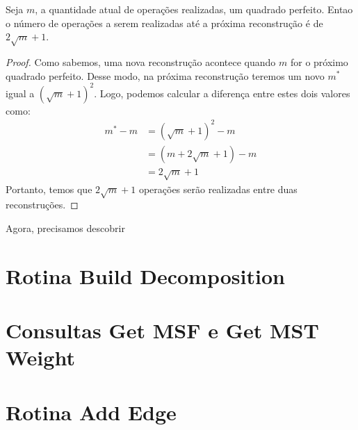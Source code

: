 \begin{corollary}
    \label{coro:amt-op}
    Seja $m$, a quantidade atual de operações realizadas, um quadrado perfeito. Entao o número de operações a serem realizadas até a próxima reconstrução é de $2 \sqrt{m} + 1$.
\end{corollary}
\begin{proof}
    Como sabemos, uma nova reconstrução acontece quando $m$ for o próximo quadrado perfeito. Desse modo, na próxima reconstrução teremos um novo $m^*$ igual a $(\sqrt m + 1)^2$. Logo, podemos calcular a diferença entre estes dois valores como:
    \begin{align*}
        m^* - m & = (\sqrt m + 1)^2 - m    \\
                & = (m + 2\sqrt m + 1) - m \\
                & = 2\sqrt m + 1
    \end{align*}
    Portanto, temos que $2\sqrt m + 1$ operações serão realizadas entre duas reconstruções.
\end{proof}

Agora, precisamos descobrir





\section{Rotina Build Decomposition}
\label{sec:rmsf-build-decomposition}



\section{Consultas Get MSF e Get MST Weight}
\label{sec:rmsf-get-msf}



\section{Rotina Add Edge}
\label{sec:rmsf-add-edge}

